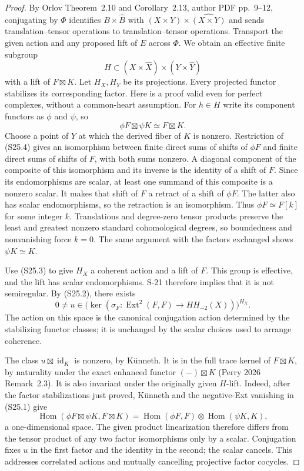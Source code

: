 \documentclass[11pt,a4paper]{article}
\theoremstyle{definition}
\begin{document}
\begin{proof}
By Orlov Theorem~2.10 and Corollary~2.13, author PDF
pp.~9--12, conjugating by $\Phi$ identifies
$B\times\widehat B$ with
$(X\times Y)\times\widehat{(X\times Y)}$ and sends
translation--tensor operations to translation--tensor
operations. Transport the given action and any proposed
lift of $E$ across $\Phi$. We obtain an effective finite
subgroup
\[
 H\subset (X\times\widehat X)\times(Y\times\widehat Y)
\]
with a lift of $F\boxtimes K$. Let $H_X,H_Y$ be its
projections. Every projected functor stabilizes its
corresponding factor. Here is a proof valid even for
perfect complexes, without a common-heart assumption.
For $h\in H$ write its component functors as $\phi$ and
$\psi$, so
\[
 \phi F\boxtimes\psi K\simeq F\boxtimes K.
 \tag{S25.4}
\]
Choose a point of $Y$ at which the derived fiber of $K$
is nonzero. Restriction of (S25.4) gives an isomorphism
between finite direct sums of shifts of $\phi F$ and
finite direct sums of shifts of $F$, with both sums
nonzero. A diagonal component of the composite of this
isomorphism and its inverse is the identity of a shift
of $F$. Since its endomorphisms are scalar, at least one
summand of this composite is a nonzero scalar. It makes
that shift of $F$ a retract of a shift of $\phi F$.
The latter also has scalar endomorphisms, so the retraction
is an isomorphism. Thus $\phi F\simeq F[k]$ for some
integer $k$. Translations and degree-zero tensor products
preserve the least and greatest nonzero standard
cohomological degrees, so boundedness and nonvanishing
force $k=0$. The same argument with the factors exchanged
shows $\psi K\simeq K$.

Use (S25.3) to give $H_X$ a coherent action and a lift of
$F$. This group is effective, and the lift has scalar
endomorphisms. S-21 therefore implies that it is not
semiregular. By (S25.2), there exists
\[
 0\ne u\in
 \bigl(\ker(\sigma_F:\operatorname{Ext}^2(F,F)
                         \to HH_{-2}(X))\bigr)^{H_X}.
 \tag{S25.5}
\]
The action on this space is the canonical conjugation
action determined by the stabilizing functor classes;
it is unchanged by the scalar choices used to arrange
coherence.

The class $u\boxtimes\operatorname{id}_K$ is nonzero,
by K\"unneth. It is in the full trace kernel of
$F\boxtimes K$, by naturality under the exact enhanced
functor $(-)\boxtimes K$ (Perry 2026 Remark~2.3).
It is also invariant under the originally given $H$-lift.
Indeed, after the factor stabilizations just proved,
K\"unneth and the negative-Ext vanishing in (S25.1) give
\[
 \operatorname{Hom}(\phi F\boxtimes\psi K,F\boxtimes K)
  =\operatorname{Hom}(\phi F,F)\otimes
       \operatorname{Hom}(\psi K,K),
\]
a one-dimensional space. The given product linearization
therefore differs from the tensor product of any two
factor isomorphisms only by a scalar. Conjugation fixes
$u$ in the first factor and the identity in the second;
the scalar cancels. This addresses correlated actions
and mutually cancelling projective factor cocycles.


\end{proof}
\end{document}
